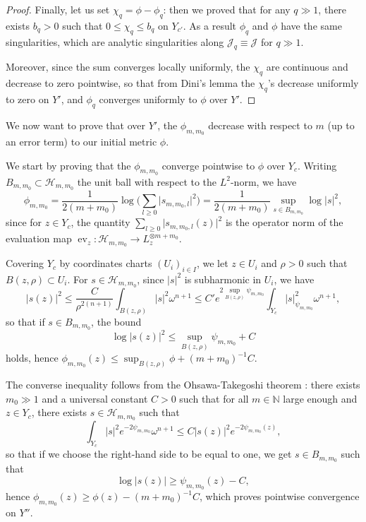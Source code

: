 \documentclass[JEP,XML,SOM,Unicode,published]{cedram}
\let\ts\textstyle
\theoremstyle{definition}
\newcommand \N{\mathbb N}
\DeclareMathOperator{\ev}{ev}
\begin{document}
\begin{proof}
Finally, let us set $\chi_q = \phi - \phi_q$: then we proved that for any $q \gg 1$, there exists $b_q >0$ such that $0 \le \chi_q \le b_q$ on $Y_{c'}$. As a result $\phi_q$ and $\phi$ have the same singularities, which are analytic singularities along $\mathscr{J}_q \equiv \mathscr{J}$ for $q \gg 1$.

Moreover, since the sum converges locally uniformly, the $\chi_q$ are continuous and decrease to zero pointwise, so that from Dini's lemma the $\chi_q$'s decrease uniformly to zero on $Y'$, and $\phi_q$ converges uniformly to $\phi$ over $Y'$.
\end{proof}
We now want to prove that over $Y'$, the $\phi_{m, m_0}$ decrease with respect to $m$ (up to an error term) to our initial metric $\phi$.

We start by proving that the $\phi_{m, m_0}$ converge pointwise to $\phi$ over $Y_c$. Writing $B_{m, m_0} \subset \mathscr{H}_{m, m_0}$ the unit ball with respect to the $L^2$-norm, we have\vspace*{-3pt}
\[
\phi_{m, m_0} = \frac{1}{2(m+m_0)} \log \bigl({\ts\sum_{l \ge 0} \lvert s_{m, m_0, l} \rvert^2} \bigr)= \frac{1}{2(m+m_0)} \sup_{s \in B_{m, m_0}} \log \lvert s \rvert^2,
\]
since for $z \in Y_c$, the quantity $\sum_{l \ge 0} \lvert s_{m, m_0, l}(z) \rvert^2$ is the operator norm of the evaluation map $\ev_z: \mathscr{H}_{m, m_0} \to L^{\otimes m+m_0}_z$.

Covering $Y_c$ by coordinates charts $(U_i)_{i \in I}$, we let $z \in U_i$ and $\rho>0$ such that $B(z, \rho) \subset U_i$. For $s \in \mathscr{H}_{m, m_0}$, since $\lvert s \rvert^2$ is subharmonic in $U_i$, we have
\[
\lvert s(z) \rvert^2 \le \frac{C}{\rho^{2(n+1)}} \int_{B(z,\rho)} \lvert s \rvert^2 \omega^{n+1} \le C' e^{2\sup_{B(z, \rho)} \psi_{m, m_0}} \int_{Y_c} \lvert s\rvert_{\psi_{m, m_0}}^2 \omega^{n+1},
\]
so that if $s \in B_{m, m_0}$, the bound
\[
\log \lvert s(z) \rvert^2 \le \sup_{B(z, \rho)} \psi_{m, m_0} +C
\]
holds, hence $\phi_{m, m_0}(z) \le \sup_{B(z, \rho)} \phi + (m+m_0)^{-1}C$.

The converse inequality follows from the Ohsawa-Takegoshi theorem \cite{DemOT}: there exists $m_0 \gg1$ and a universal constant $C>0$ such that for all $m \in \N$ large enough and $z \in Y_c$, there exists $s \in \mathscr{H}_{m, m_0}$ such that
\[
\int_{Y_c} \lvert s \rvert^2 e^{-2\psi_{m, m_0}} \omega^{n+1} \le C \lvert s(z) \rvert^2 e^{-2\psi_{m, m_0}(z)},
\]
so that if we choose the right-hand side to be equal to one, we get $s \in B_{m, m_0}$ such that
\[
\log \lvert s(z) \rvert \ge \psi_{m, m_0}(z)-C,
\]
hence $\phi_{m, m_0}(z) \ge \phi(z) - (m+m_0)^{-1}C$, which proves pointwise convergence on $Y''$.
\end{document}
